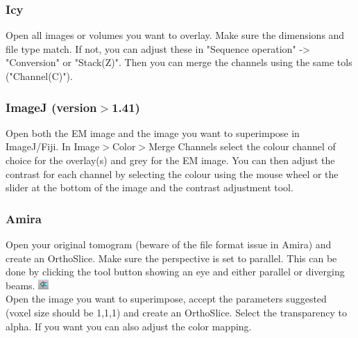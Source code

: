 \documentclass[10pt,a4paper,onepage,DIV12]{scrartcl}
\begin{document}
\subsubsection*{Icy}

Open all images or volumes you want to overlay. Make sure the dimensions and file type match. If not, you can adjust these in "Sequence operation" -> "Conversion" or "Stack(Z)". Then you can merge the channels using the same tols ("Channel(C)").

\subsubsection*{ImageJ (version$>$1.41)}
Open both the EM image and the image you want to superimpose in ImageJ/Fiji. In Image$>$Color$>$Merge Channels select the colour channel of choice for the overlay(s) and grey for the EM image. You can then adjust the contrast for each channel by selecting the colour using the mouse wheel or the slider at the bottom of the image and the contrast adjustment tool.

\subsubsection*{Amira}
Open your original tomogram (beware of the file format issue in Amira) and create an OrthoSlice. Make sure the perspective is set to parallel. This can be done by clicking the tool button showing an eye and either parallel or diverging beams. \includegraphics[width=0.03\textwidth]{images/perspective.png}\\Open the image you want to superimpose, accept the parameters suggested (voxel size should be 1,1,1) and create an OrthoSlice. Select the transparency to alpha. If you want you can also adjust the color mapping. 
\end{document}
